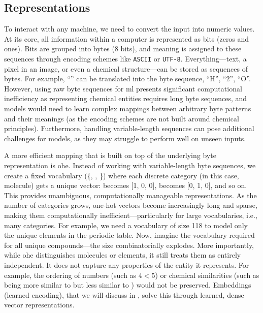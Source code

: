 \subsection{Representations}
To interact with any machine, we need to convert the input into numeric values. At its core, all information within a computer is represented as bits (zeros and ones). 
Bits are grouped into bytes (8 bits), and meaning is assigned to these sequences through encoding schemes like \texttt{ASCII} or \texttt{UTF-8}. 
Everything---text, a pixel in an image, or even a chemical structure---can be stored as sequences of bytes. 
For example, \enquote{} can be translated into the byte sequence, \enquote{H}, \enquote{2}, \enquote{O}. 
However, using raw byte sequences for \gls{ml} presents significant computational inefficiency as representing chemical entities requires long byte sequences, and models would need to learn complex mappings between arbitrary byte patterns and their meanings (as the encoding schemes are not built around chemical principles). 
Furthermore, handling variable-length sequences can pose additional challenges for models, as they may struggle to perform well on unseen inputs. \autocite{zhou2023algorithms,baillargeon2022assessing} 

A more efficient mapping that is built on top of the underlying byte representation is \gls{ohe}. 
Instead of working with variable-length byte sequences, we create a fixed vocabulary (\{, , \}) where each discrete category (in this case, molecule) gets a unique vector:  becomes [1, 0, 0],  becomes [0, 1, 0], and so on. 
This provides unambiguous, computationally manageable representations. 
As the number of categories grows, one-hot vectors become increasingly long and sparse, making them computationally inefficient---particularly for large vocabularies, i.e., many categories.
For example, we need a vocabulary of size 118 to model only the unique elements in the periodic table. 
Now, imagine the vocabulary required for all unique compounds---the size combinatorially explodes. 
More importantly, while \gls{ohe} distinguishes molecules or elements, it still treats them as entirely independent. 
It does not capture any properties of the entity it represents. For example, the ordering of numbers (such as $4<5$) or chemical similarities (such as  being more similar to  but less similar to ) would not be preserved. \autocite{chuang2018comment}
Embeddings (learned encoding), that we will discuss in , solve this through learned, dense vector representations.

